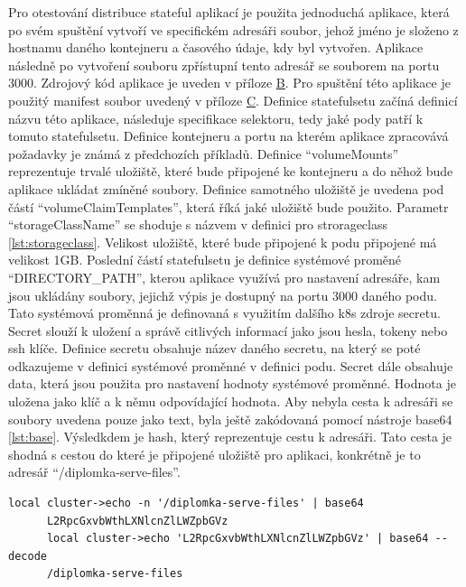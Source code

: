 \par
      Pro otestování distribuce stateful aplikací je použita jednoduchá aplikace, která \linebreak po svém spuštění vytvoří ve specifickém adresáři soubor, jehož jméno je složeno \linebreak z hostnamu daného kontejneru a časového údaje, kdy byl vytvořen. Aplikace následně \linebreak po vytvoření souboru zpřístupní tento adresář se souborem na portu 3000. Zdrojový kód aplikace je uveden v příloze \hyperref[app:servefiles]{B}. Pro spuštění této aplikace je použitý manifest soubor uvedený v příloze \hyperref[app:statefulset]{C}. Definice statefulsetu začíná definicí názvu této aplikace, následuje specifikace selektoru, tedy jaké pody patří k tomuto statefulsetu. Definice kontejneru a portu na kterém aplikace zpracovává požadavky je známá z předchozích příkladů. Definice “volumeMounts” reprezentuje trvalé uložiště, které bude připojené \linebreak ke kontejneru a do něhož bude aplikace ukládat zmíněné soubory. Definice samotného uložiště je uvedena pod částí “volumeClaimTemplates”, která říká jaké uložiště bude použito. Parametr “storageClassName” se shoduje s názvem v definici pro strorageclass \ref{lst:storageclass}. Velikost uložiště, které bude připojené k podu připojené má velikost 1GB. Poslední částí statefulsetu je definice systémové proměné “DIRECTORY\_PATH”, kterou aplikace využívá pro nastavení adresáře, kam jsou ukládány soubory, jejichž výpis je dostupný na portu 3000 daného podu. Tato systémová proměnná je definovaná s využitím dalšího k8s zdroje secretu. Secret slouží k uložení a správě citlivých informací jako jsou hesla, tokeny nebo ssh klíče. Definice secretu obsahuje název daného secretu, na který se poté odkazujeme v definici systémové proměnné v definici podu. Secret dále obsahuje data, která jsou použita pro nastavení hodnoty systémové proměnné. Hodnota je uložena jako klíč a k němu odpovídající hodnota. Aby nebyla cesta \linebreak k adresáři se soubory uvedena pouze jako text, byla ještě zakódovaná pomocí nástroje base64 \ref{lst:base}. Výsledkdem je hash, který reprezentuje cestu k adresáři. Tato cesta je shodná s cestou do které je připojené uložiště pro aplikaci, konkrétně je to adresář “/diplomka-serve-files”.

\begin{lstlisting}[caption={Zakódování textu pomocí base64 nástroje},label=lst:base]
      local cluster->echo -n '/diplomka-serve-files' | base64
      L2RpcGxvbWthLXNlcnZlLWZpbGVz
      local cluster->echo 'L2RpcGxvbWthLXNlcnZlLWZpbGVz' | base64 --decode
      /diplomka-serve-files
\end{lstlisting}

